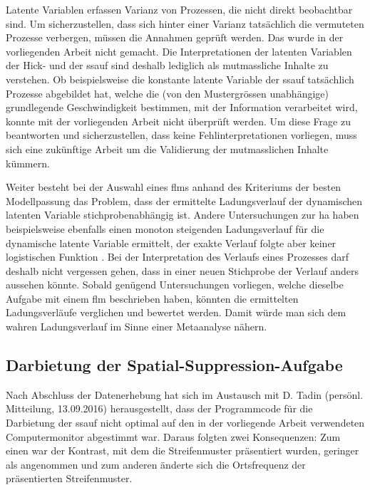 \documentclass[11pt, twoside, a4paper]{book}		%
\begin{document}
Latente Variablen erfassen Varianz von Prozessen, die nicht direkt beobachtbar sind. Um sicherzustellen, dass sich hinter einer Varianz tatsächlich die vermuteten Prozesse verbergen, müssen die Annahmen geprüft werden. Das wurde in der vorliegenden Arbeit nicht gemacht. Die Interpretationen der latenten Variablen der Hick- und der \gls{ssauf} sind deshalb lediglich als mutmassliche Inhalte zu verstehen. Ob beispielsweise die konstante latente Variable der \gls{ssauf} tatsächlich Prozesse abgebildet hat, welche die (von den Mustergrössen unabhängige) grundlegende Geschwindigkeit bestimmen, mit der Information verarbeitet wird, konnte mit der vorliegenden Arbeit nicht überprüft werden. Um diese Frage zu beantworten und sicherzustellen, dass keine Fehlinterpretationen vorliegen, muss sich eine zukünftige Arbeit um die Validierung der mutmasslichen Inhalte kümmern.

Weiter besteht bei der Auswahl eines \gls{flm}s anhand des Kriteriums der besten Modellpassung das Problem, dass der ermittelte Ladungsverlauf der dynamischen latenten Variable stichprobenabhängig ist. 
Andere Untersuchungen zur \gls{ha} haben beispielsweise ebenfalls einen monoton steigenden Ladungsverlauf für die dynamische latente Variable ermittelt, der exakte Verlauf folgte aber keiner logistischen Funktion \citep{Borter2013, Pahud2017, Schweizer2006b}. Bei der Interpretation des Verlaufs eines Prozesses darf deshalb nicht vergessen gehen, dass in einer neuen Stichprobe der Verlauf anders aussehen könnte. Sobald genügend Untersuchungen vorliegen, welche dieselbe Aufgabe mit einem \gls{flm} beschrieben haben, könnten die ermittelten Ladungsverläufe verglichen und bewertet werden. Damit würde man sich dem wahren Ladungsverlauf im Sinne einer Metaanalyse nähern.

\subsection{Darbietung der Spatial-Suppression-Aufgabe}


Nach Abschluss der Datenerhebung hat sich im Austausch mit D. Tadin (persönl. Mitteilung, 13.09.2016) herausgestellt, dass der  Programmcode für die Darbietung der \gls{ssauf} nicht optimal auf den in der vorliegende Arbeit verwendeten Computermonitor abgestimmt war. Daraus folgten zwei Konsequenzen: Zum einen war der Kontrast, mit dem die Streifenmuster präsentiert wurden, geringer als angenommen und zum anderen änderte sich die Ortsfrequenz der präsentierten Streifenmuster.
\end{document}
